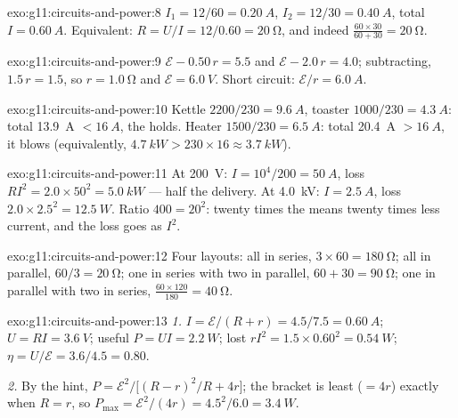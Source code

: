 \begin{solution}{exo:g11:circuits-and-power:8}
$I_1 = 12/60 = \qty{0.20}{A}$, $I_2 = 12/30 = \qty{0.40}{A}$, total
$I = \qty{0.60}{A}$. Equivalent: $R = U/I = 12/0.60 = \qty{20}{\ohm}$,
and indeed $\frac{60 \times 30}{60 + 30} = \qty{20}{\ohm}$.
\end{solution}

\begin{solution}{exo:g11:circuits-and-power:9}
$\mathcal{E} - 0.50\,r = 5.5$ and $\mathcal{E} - 2.0\,r = 4.0$;
subtracting, $1.5\,r = 1.5$, so $r = \qty{1.0}{\ohm}$ and $\mathcal{E} =
\qty{6.0}{V}$. Short circuit: $\mathcal{E}/r = \qty{6.0}{A}$.
\end{solution}

\begin{solution}{exo:g11:circuits-and-power:10}
Kettle $2200/230 = \qty{9.6}{A}$, toaster $1000/230 = \qty{4.3}{A}$:
total \qty{13.9}{A} $< \qty{16}{A}$, the  holds. Heater $1500/230 =
\qty{6.5}{A}$: total \qty{20.4}{A} $> \qty{16}{A}$, it blows
(equivalently, $\qty{4.7}{kW} > 230 \times 16 \approx \qty{3.7}{kW}$).
\end{solution}

\begin{solution}{exo:g11:circuits-and-power:11}
At \qty{200}{V}: $I = 10^4/200 = \qty{50}{A}$, loss $RI^2 = 2.0 \times
50^2 = \qty{5.0}{kW}$ --- half the delivery. At \qty{4.0}{kV}: $I =
\qty{2.5}{A}$, loss $2.0 \times 2.5^2 = \qty{12.5}{W}$. Ratio $400 =
20^2$: twenty times the  means twenty times less current, and
the loss goes as $I^2$.
\end{solution}

\begin{solution}{exo:g11:circuits-and-power:12}
Four layouts: all in series, $3 \times 60 = \qty{180}{\ohm}$; all in
parallel, $60/3 = \qty{20}{\ohm}$; one in series with two in parallel,
$60 + 30 = \qty{90}{\ohm}$; one in parallel with two in series,
$\frac{60 \times 120}{180} = \qty{40}{\ohm}$.
\end{solution}

\begin{solution}{exo:g11:circuits-and-power:13}
\emph{1.} $I = \mathcal{E}/(R + r) = 4.5/7.5 = \qty{0.60}{A}$;
$U = RI = \qty{3.6}{V}$; useful $P = UI = \qty{2.2}{W}$; lost $rI^2 =
1.5 \times 0.60^2 = \qty{0.54}{W}$; $\eta = U/\mathcal{E} = 3.6/4.5 =
0.80$.

\emph{2.} By the hint, $P = \mathcal{E}^2 \big/ \big[(R - r)^2/R +
4r\big]$; the bracket is least ($= 4r$) exactly when $R = r$, so
$P_{\max} = \mathcal{E}^2/(4r) = 4.5^2/6.0 = \qty{3.4}{W}$.
\end{solution}


